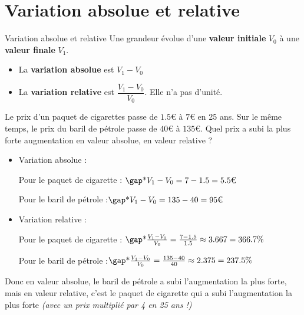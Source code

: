 \documentclass[10pt,a4paper,openany,twoside, prof]{book}
\begin{document}
\entetegal{}



\section{Variation absolue et relative}

\begin{defi}{Variation absolue et relative}{}
Une grandeur évolue d'une \textbf{valeur initiale} $V_0$ à une \textbf{valeur finale} $V_1$.
\begin{itemize}
\item La \textbf{variation absolue} est $V_1-V_0$
\item La \textbf{variation relative} est $\dfrac{V_1-V_0}{V_0}$. Elle n'a pas d'unité.
\end{itemize}
\end{defi}

\begin{ex}{}{}
Le prix d'un paquet de cigarettes passe de $1.5$€ à $7$€ en 25 ans.
Sur le même temps, le prix du baril de pétrole passe de $40$€ à $135$€.
Quel prix a subi la plus forte augmentation en valeur absolue, en valeur relative ?
\bigbreak

\begin{itemize}
	\item Variation absolue :

	Pour le paquet de cigarette : $\troum{V_1-V_0 = 7 - 1.5 = 5.5\text{€}}$

	Pour le baril de pétrole :\quad$\troum{V_1-V_0 = 135 - 40 = 95\text{€}}$

	\item Variation relative :

	Pour le paquet de cigarette : $\troum{\frac{V_1-V_0}{V_0} = \frac{7-1.5}{1.5} \approx 3.667 = 366.7\%}$

	Pour le baril de pétrole :\quad$\troum{\frac{V_1-V_0}{V_0} = \frac{135-40}{40} \approx 2.375 = 237.5\%}$
\end{itemize}

Donc en valeur absolue, le baril de pétrole a subi l'augmentation la plus forte, mais en valeur relative, c'est le paquet de cigarette qui a subi l'augmentation la plus forte \textit{(avec un prix multiplié par 4 en 25 ans !)}
\end{ex}
\end{document}
